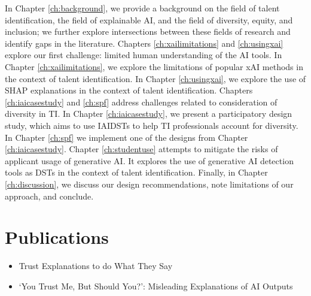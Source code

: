 In Chapter \ref{ch:background}, we provide a background on the field of talent identification, the field of explainable AI, and the field of diversity, equity, and inclusion; we further explore intersections between these fields of research and identify gaps in the literature. Chapters \ref{ch:xailimitations} and \ref{ch:usingxai} explore our first challenge: limited human understanding of the AI tools. In Chapter \ref{ch:xailimitations}, we explore the limitations of popular xAI methods in the context of talent identification. In Chapter \ref{ch:usingxai}, we explore the use of SHAP explanations in the context of talent identification. Chapters \ref{ch:iaicasestudy} and \ref{ch:spf}  address challenges related to consideration of diversity in TI. In Chapter \ref{ch:iaicasestudy}, we present a participatory design study, which aims to use IAIDSTs to help TI professionals account for diversity. In Chapter \ref{ch:spf} we implement one of the designs from Chapter \ref{ch:iaicasestudy}. Chapter \ref{ch:studentuse} attempts to mitigate the risks of applicant usage of generative AI. It explores the use of generative AI detection tools as DSTs in the context of talent identification. Finally, in Chapter \ref{ch:discussion}, we discuss our design recommendations, note limitations of our approach, and conclude.

\section{Publications}

\begin{itemize}
    \item \textcite{natarajan_trust_2023} Trust Explanations to do What They Say
    \item \textcite{citation needed} `You Trust Me, But Should You?': Misleading Explanations of AI Outputs
\end{itemize}